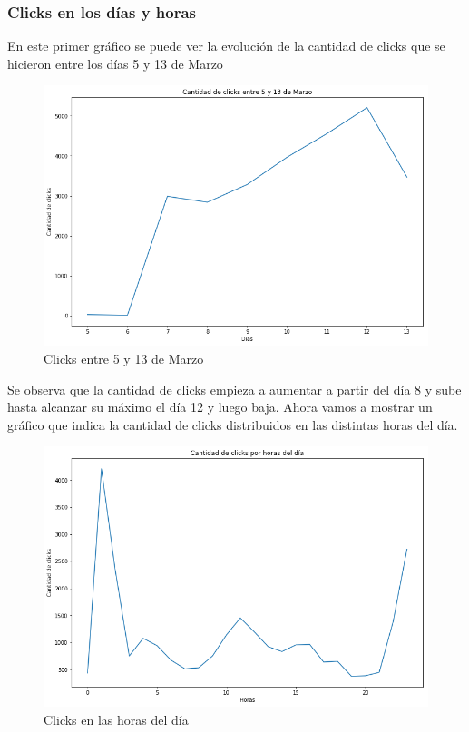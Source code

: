 \documentclass[a4paper, 12pt]{article}
\begin{document}
	\subsubsection{Clicks en los días y horas}
		En este primer gráfico se puede ver la evolución de la cantidad de clicks que se hicieron entre los días 5 y 13 de Marzo


		\begin{figure}[H]
			\centering
			\includegraphics[width=\textwidth]{images/clicks/clicks_days.png}
			\caption{Clicks entre 5 y 13 de Marzo}
		\end{figure}


		 Se observa que la cantidad de clicks empieza a aumentar a partir del día 8 y sube hasta alcanzar su máximo el día 12 y luego baja.
		\clearpage
		 Ahora vamos a mostrar un gráfico que indica la cantidad de clicks distribuidos en las distintas horas del día.


		\begin{figure}[H]
			\centering
			\includegraphics[width=\textwidth]{images/clicks/clicks_hours.png}
			\caption{Clicks en las horas del día}
		\end{figure}
\end{document}
